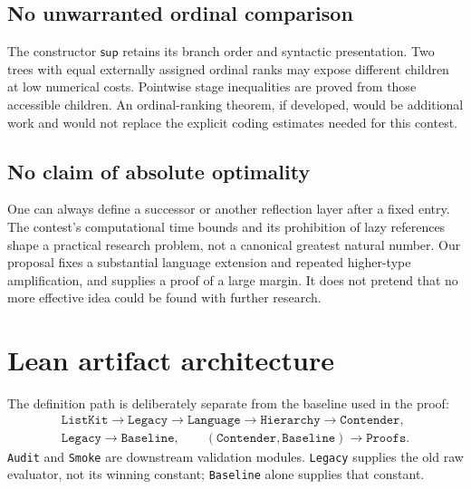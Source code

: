 \documentclass[11pt]{article}
\theoremstyle{definition}
\newcommand{\Sup}{\mathsf{sup}}
\newcommand{\code}[1]{\texttt{#1}}
\begin{document}
\subsection{No unwarranted ordinal comparison}

The constructor $\Sup$ retains its branch order and syntactic presentation.
Two trees with equal externally assigned ordinal ranks may expose different
children at low numerical costs. Pointwise stage inequalities are proved
from those accessible children. An ordinal-ranking theorem, if developed,
would be additional work and would not replace the explicit coding
estimates needed for this contest.

\subsection{No claim of absolute optimality}

One can always define a successor or another reflection layer after a fixed
entry. The contest's computational time bounds and its prohibition of lazy
references shape a practical research problem, not a canonical greatest
natural number. Our proposal fixes a substantial language extension and
repeated higher-type amplification, and supplies a proof of a large margin.
It does not pretend that no more effective idea could be found with further
research.

\section{Lean artifact architecture}
\label{sec:implementation}

The definition path is deliberately separate from the baseline used in the
proof:
\[
\begin{gathered}
 \code{ListKit}\longrightarrow\code{Legacy}\longrightarrow\code{Language}
 \longrightarrow\code{Hierarchy}\longrightarrow\code{Contender},\\
 \code{Legacy}\longrightarrow\code{Baseline},\qquad
 (\code{Contender},\code{Baseline})\longrightarrow\code{Proofs}.
\end{gathered}
\]
\code{Audit} and \code{Smoke} are downstream validation modules.
\code{Legacy} supplies the old raw evaluator, not its winning constant;
\code{Baseline} alone supplies that constant.
\end{document}
